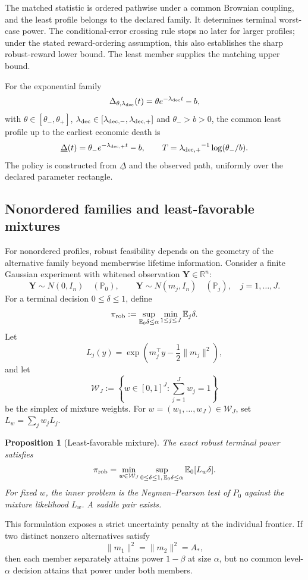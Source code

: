 \documentclass[11pt]{article}
\numberwithin{equation}{section}
\theoremstyle{plain}
\newtheorem{proposition}[theorem]{Proposition}
\theoremstyle{definition}
\theoremstyle{remark}
\newcommand{\Pzero}{\mathbb P_0}
\newcommand{\Ezero}{\mathbb E_0}
\begin{document}
The matched statistic is ordered pathwise under a common Brownian coupling, and the least profile belongs to the declared family. It determines terminal worst-case power. The conditional-error crossing rule stops no later for larger profiles; under the stated reward-ordering assumption, this also establishes the sharp robust-reward lower bound. The least member supplies the matching upper bound.

For the exponential family
\[
\Delta_{\theta,{\lambda_{{\rm dec}}}}(t)=\theta e^{-{\lambda_{{\rm dec}}} t}-b,
\]
with $\theta\in[\theta_-,\theta_+]$, ${\lambda_{{\rm dec}}}\in[{\lambda_{{\rm dec},-}},{\lambda_{{\rm dec},+}}]$ and $\theta_->b>0$, the common least profile up to the earliest economic death is
\[
\underline\Delta(t)=\theta_-e^{-{\lambda_{{\rm dec},+}}t}-b,
\qquad
T={\lambda_{{\rm dec},+}}^{-1}\log(\theta_-/b).
\]
The policy is constructed from $\underline\Delta$ and the observed path, uniformly over the declared parameter rectangle.

\subsection{Nonordered families and least-favorable mixtures}\label{nonordered-unknown-decay}

For nonordered profiles, robust feasibility depends on the geometry of the alternative family beyond memberwise lifetime information. Consider a finite Gaussian experiment with whitened observation $\mathbf Y\in\mathbb R^n$:
\[
\mathbf Y\sim N(0,I_n)\quad(\Pzero),
\qquad
\mathbf Y\sim N(m_j,I_n)\quad(\mathbb P_j),\quad j=1,\ldots,J.
\]
For a terminal decision $0\le\delta\le1$, define
\[
\pi_{\rm rob}
:=\sup_{\Ezero\delta\le\alpha}
\min_{1\le j\le J}\mathbb E_j\delta.
\]
Let
\[
L_j(y)=\exp\!\left(m_j^\top y-\frac12\|m_j\|^2\right),
\]
and let
\[
\mathcal W_J:=\left\{w\in[0,1]^J:\sum_{j=1}^J w_j=1\right\}
\]
be the simplex of mixture weights. For $w=(w_1,\ldots,w_J)\in\mathcal W_J$, set $L_w=\sum_jw_jL_j$.

\begin{proposition}[Least-favorable mixture]\label{prop:least-favorable-mixture}
The exact robust terminal power satisfies
\[
\pi_{\rm rob}
=
\min_{w\in\mathcal W_J}
\sup_{0\le\delta\le1,\,\Ezero\delta\le\alpha}
\Ezero[L_w\delta].
\]
For fixed $w$, the inner problem is the Neyman--Pearson test of $P_0$ against the mixture likelihood $L_w$.  A saddle pair exists.
\end{proposition}

This formulation exposes a strict uncertainty penalty at the individual frontier.  If two distinct nonzero alternatives satisfy
\[
\|m_1\|^2=\|m_2\|^2=A_*,
\]
then each member separately attains power $1-\beta$ at size $\alpha$, but no common level-$\alpha$ decision attains that power under both members.
\end{document}
